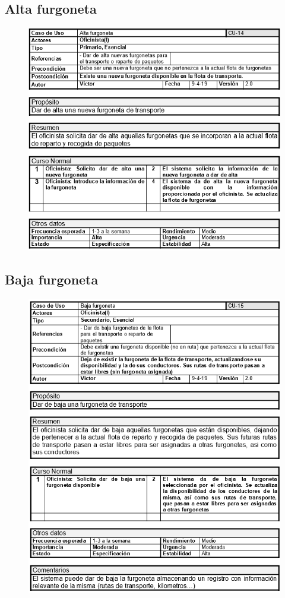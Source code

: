 \subsection{Alta furgoneta}
\begin{figure}[H]
	\centering
	\includegraphics[width=16cm]{14}
\end{figure}
\subsection{Baja furgoneta}
\begin{figure}[H]
	\centering
	\includegraphics[width=16cm]{15}
\end{figure}
